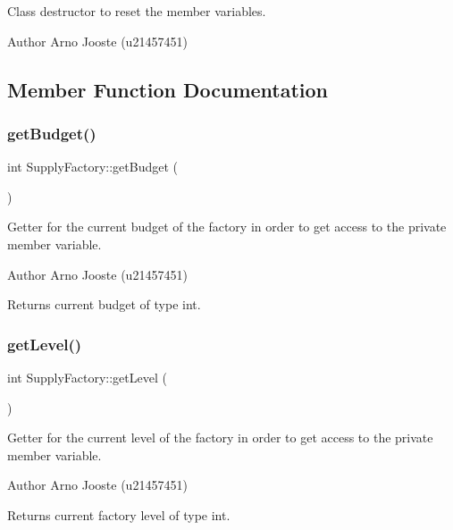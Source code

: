 Class destructor to reset the member variables. 

\begin{DoxyAuthor}{Author}
Arno Jooste (u21457451) 
\end{DoxyAuthor}


\subsection{Member Function Documentation}
\mbox{\label{class_supply_factory_afbb886c670c202fa929913da4bc8ae7c}} 
\subsubsection{\texorpdfstring{getBudget()}{getBudget()}}
{\footnotesize\ttfamily int Supply\+Factory\+::get\+Budget (\begin{DoxyParamCaption}{ }\end{DoxyParamCaption})}



Getter for the current budget of the factory in order to get access to the private member variable. 

\begin{DoxyAuthor}{Author}
Arno Jooste (u21457451) 
\end{DoxyAuthor}
\begin{DoxyReturn}{Returns}
current budget of type int. 
\end{DoxyReturn}
\mbox{\label{class_supply_factory_a9f75ffec504f752de0a7f4beb36ded96}} 
\subsubsection{\texorpdfstring{getLevel()}{getLevel()}}
{\footnotesize\ttfamily int Supply\+Factory\+::get\+Level (\begin{DoxyParamCaption}{ }\end{DoxyParamCaption})}



Getter for the current level of the factory in order to get access to the private member variable. 

\begin{DoxyAuthor}{Author}
Arno Jooste (u21457451) 
\end{DoxyAuthor}
\begin{DoxyReturn}{Returns}
current factory level of type int. 
\end{DoxyReturn}
\mbox{\label{class_supply_factory_a0633bf00c82f0d350fe29e02d21f0631}} 
